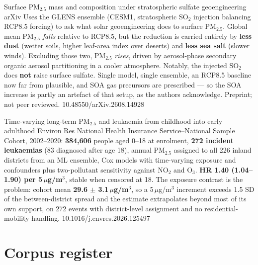 \documentclass[10pt]{article}
\begin{document}

{Surface PM$_{2.5}$ mass and composition under stratospheric sulfate geoengineering}
{arXiv}
{Uses the GLENS ensemble (CESM1, stratospheric SO$_2$ injection balancing RCP8.5 forcing) to
ask what solar geoengineering does to surface PM$_{2.5}$. Global mean PM$_{2.5}$
\emph{falls} relative to RCP8.5, but the reduction is carried entirely by \textbf{less dust}
(wetter soils, higher leaf-area index over deserts) and \textbf{less sea salt} (slower
winds). Excluding those two, PM$_{2.5}$ \emph{rises}, driven by aerosol-phase secondary
organic aerosol partitioning in a cooler atmosphere. Notably, the injected SO$_2$ does
\textbf{not} raise surface sulfate. Single model, single ensemble, an RCP8.5 baseline now far
from plausible, and SOA gas precursors are prescribed --- so the SOA increase is partly an
artefact of that setup, as the authors acknowledge. Preprint; not peer reviewed.}
{10.48550/arXiv.2608.14928}


{Time-varying long-term PM$_{2.5}$ and leukaemia from childhood into early adulthood}
{Environ Res}
{National Health Insurance Service--National Sample Cohort, 2002--2020:
\textbf{384{,}606} people aged 0--18 at enrolment, \textbf{272 incident leukaemias}
(83 diagnosed after age 18), annual PM$_{2.5}$ assigned to all 226 inland districts from an
ML ensemble, Cox models with time-varying exposure and confounders plus two-pollutant
sensitivity against NO$_2$ and O$_3$. \textbf{HR 1.40 (1.04--1.90) per 5\,$\mu$g/m$^3$},
stable when censored at 18. The exposure contrast is the problem: cohort mean
\textbf{29.6 $\pm$ 3.1\,$\mu$g/m$^3$}, so a 5\,$\mu$g/m$^3$ increment exceeds 1.5 SD of the
between-district spread and the estimate extrapolates beyond most of its own support, on
272 events with district-level assignment and no residential-mobility handling.}
{10.1016/j.envres.2026.125497}

\clearpage

\section*{\sffamily\bfseries\color{Deep}Corpus register}
\vspace{-1.5mm}{\color{Amber}\rule{\linewidth}{1.1pt}}\vspace{2.5mm}
\end{document}
